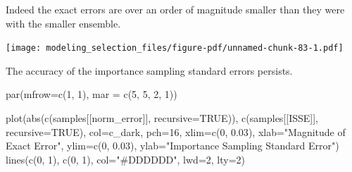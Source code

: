 \documentclass[
  letterpaper,
  DIV=11,
  numbers=noendperiod]{scrartcl}
\newenvironment{Shaded}{\begin{snugshade}}{\end{snugshade}}
\newcommand{\AttributeTok}[1]{\textcolor[rgb]{0.40,0.45,0.13}{#1}}
\newcommand{\ConstantTok}[1]{\textcolor[rgb]{0.56,0.35,0.01}{#1}}
\newcommand{\DecValTok}[1]{\textcolor[rgb]{0.68,0.00,0.00}{#1}}
\newcommand{\FloatTok}[1]{\textcolor[rgb]{0.68,0.00,0.00}{#1}}
\newcommand{\FunctionTok}[1]{\textcolor[rgb]{0.28,0.35,0.67}{#1}}
\newcommand{\NormalTok}[1]{\textcolor[rgb]{0.00,0.23,0.31}{#1}}
\newcommand{\SpecialCharTok}[1]{\textcolor[rgb]{0.37,0.37,0.37}{#1}}
\newcommand{\StringTok}[1]{\textcolor[rgb]{0.13,0.47,0.30}{#1}}
\begin{document}
Indeed the exact errors are over an order of magnitude smaller than they
were with the smaller ensemble.

\begin{Shaded}
\end{Shaded}

\texttt{[image: modeling\_selection\_files/figure-pdf/unnamed-chunk-83-1.pdf]}

The accuracy of the importance sampling standard errors persists.

\begin{Shaded}
\begin{Highlighting}[]
\FunctionTok{par}\NormalTok{(}\AttributeTok{mfrow=}\FunctionTok{c}\NormalTok{(}\DecValTok{1}\NormalTok{, }\DecValTok{1}\NormalTok{), }\AttributeTok{mar =} \FunctionTok{c}\NormalTok{(}\DecValTok{5}\NormalTok{, }\DecValTok{5}\NormalTok{, }\DecValTok{2}\NormalTok{, }\DecValTok{1}\NormalTok{))}

\FunctionTok{plot}\NormalTok{(}\FunctionTok{abs}\NormalTok{(}\FunctionTok{c}\NormalTok{(samples[[}\StringTok{\textquotesingle{}norm\_error\textquotesingle{}}\NormalTok{]], }\AttributeTok{recursive=}\ConstantTok{TRUE}\NormalTok{)),}
        \FunctionTok{c}\NormalTok{(samples[[}\StringTok{\textquotesingle{}ISSE\textquotesingle{}}\NormalTok{]], }\AttributeTok{recursive=}\ConstantTok{TRUE}\NormalTok{),}
     \AttributeTok{col=}\NormalTok{c\_dark, }\AttributeTok{pch=}\DecValTok{16}\NormalTok{,}
     \AttributeTok{xlim=}\FunctionTok{c}\NormalTok{(}\DecValTok{0}\NormalTok{, }\FloatTok{0.03}\NormalTok{), }\AttributeTok{xlab=}\StringTok{"Magnitude of Exact Error"}\NormalTok{,}
     \AttributeTok{ylim=}\FunctionTok{c}\NormalTok{(}\DecValTok{0}\NormalTok{, }\FloatTok{0.03}\NormalTok{), }\AttributeTok{ylab=}\StringTok{"Importance Sampling Standard Error"}\NormalTok{)}
\FunctionTok{lines}\NormalTok{(}\FunctionTok{c}\NormalTok{(}\DecValTok{0}\NormalTok{, }\DecValTok{1}\NormalTok{), }\FunctionTok{c}\NormalTok{(}\DecValTok{0}\NormalTok{, }\DecValTok{1}\NormalTok{), }\AttributeTok{col=}\StringTok{"\#DDDDDD"}\NormalTok{, }\AttributeTok{lwd=}\DecValTok{2}\NormalTok{, }\AttributeTok{lty=}\DecValTok{2}\NormalTok{)}
\end{Highlighting}
\end{Shaded}
\end{document}
